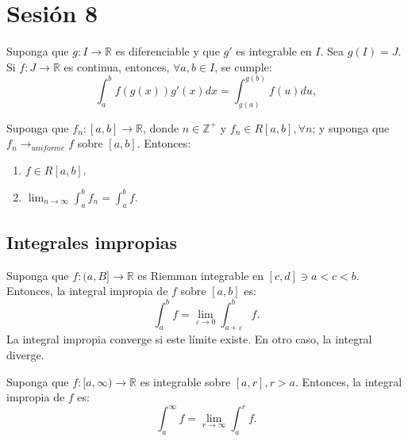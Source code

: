 \section{Sesión 8}

\begin{teorema}
	Suponga que $g:I\to\mathbb{R}$ es diferenciable y que $g'$ es integrable en $I$. Sea $g(I)=J$. Si $f:J\to\mathbb{R}$ es continua, entonces, $\forall a,b \in I$, se cumple: 
	$$\int_a^b f(g(x))g'(x)dx=\int_{g(a)}^{g(b)}f(u)du,$$
\end{teorema}


\begin{prop}
	Suponga que $f_n:[a,b]\to\mathbb{R}$, donde $n\in \mathbb{Z}^+$ y $f_n\in R[a,b], \forall n$; y suponga que $f_n \longrightarrow_{uniforme} f$ sobre $[a,b]$. Entonces: 
	\begin{enumerate}
		\item $f\in R[a,b]$. 
		\item $\lim_{n\to\infty}\int_a^b f_n=\int_a^b f$.
		\end{enumerate} 
\end{prop}

\subsection{Integrales impropias}

\begin{definicion}
	Suponga que $f:(a,B]\to\mathbb{R}$ es Riemman integrable en $[c,d]\ni a<c<b$. Entonces, la integral impropia de $f$ sobre $[a,b]$ es: 
	$$\int_a^b f=\lim_{\varepsilon\to 0}\int_{a+\varepsilon}^b f.$$
	La integral impropia converge si este límite existe. En otro caso, la integral diverge. 
\end{definicion}

\begin{definicion}
	Suponga que $f:[a,\infty)\to\mathbb{R}$ es integrable sobre $[a,r], r>a$. Entonces, la integral impropia de $f$ es: 
	$$\int_a^\infty f =\lim_{r\to\infty}\int_a^r f.$$
\end{definicion}


